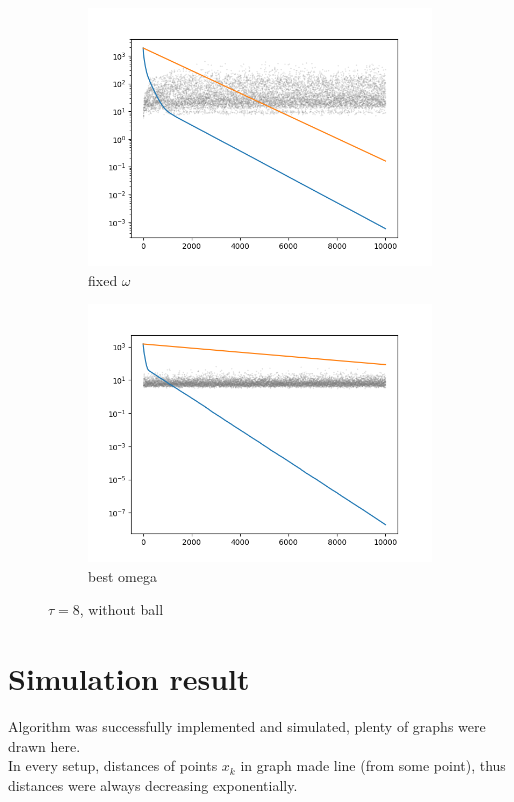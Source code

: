 \documentclass[11pt]{book}
\begin{document}
\begin{figure}[H]
\centering
\begin{subfigure}{.5\textwidth}
  \centering
  \includegraphics[width=.8\linewidth]{f8n.png}
  \caption{fixed $\omega$}
  \label{fig:sub11}
\end{subfigure}%
\begin{subfigure}{.5\textwidth}
  \centering
  \includegraphics[width=.8\linewidth]{b8n.png}
  \caption{best omega}
  \label{fig:sub12}
\end{subfigure}
\caption{$\tau=8$, without ball}
\label{fig:test6}
\end{figure}

\newpage

\section{Simulation result}

Algorithm was successfully implemented and simulated, plenty of graphs were drawn here.\\

In every setup, distances of points $x_k$ in graph made line (from some point), thus distances were always decreasing exponentially.\\
\end{document}
